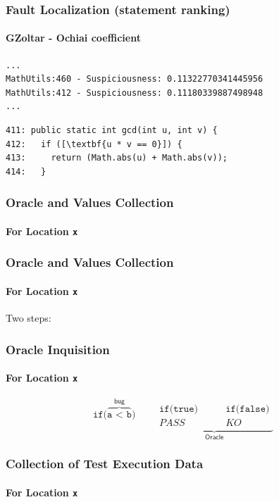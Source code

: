 \documentclass[onlymath]{beamer}
\begin{document}
\begin{frame}[fragile]
\frametitle{Fault Localization (statement ranking)}
\framesubtitle{GZoltar - Ochiai coefficient}
\begin{verbatim}
...
MathUtils:460 - Suspiciousness: 0.11322770341445956
MathUtils:412 - Suspiciousness: 0.11180339887498948
...
\end{verbatim}

\begin{lstlisting}[escapeinside=\[\]]
411: public static int gcd(int u, int v) {
412:   if ([\textbf{u * v == 0}]) {
413:     return (Math.abs(u) + Math.abs(v));
414:   }
\end{lstlisting}
\end{frame}


\frame
{
  \frametitle{Oracle and Values Collection}
  \framesubtitle{For Location \texttt{x}}
  \begin{center}
  
  \end{center}
}

\frame
{
  \frametitle{Oracle and Values Collection}
  \framesubtitle{For Location \texttt{x}}
  Two steps:
  \begin{center}
  
  \end{center}
}

\begin{frame}
  \frametitle{Oracle Inquisition}
  \framesubtitle{For Location \texttt{x}}
 \begin{equation*}
  \texttt{if(}\overbrace{\texttt{a < b}}^{\displaystyle \textsf{bug}}\texttt{)} \qquad \underbrace{\begin{array}{cc}
                                         \texttt{if(true)} \quad & \quad \texttt{if(false)} \\
                                         PASS \quad & \quad KO
                                        \end{array} }_{\displaystyle \textsf{Oracle}}
 \end{equation*}
\end{frame}

\frame
{
  \frametitle{Collection of Test Execution Data}
  \framesubtitle{For Location \texttt{x}}
  \begin{center}
  
  \end{center}
}
\end{document}
